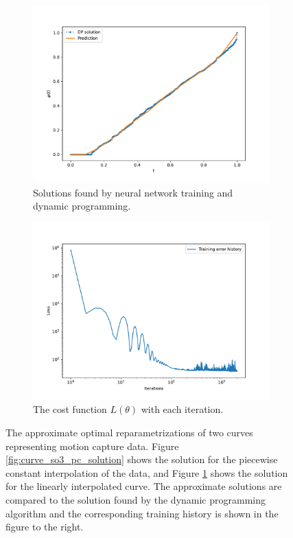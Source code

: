 \begin{figure}[t]
\begin{subfigure}[t]{0.5\textwidth}
        \centering
        \includegraphics[width=\linewidth]{figures/curve_so3/pl_eks_6/plot_288_0.pdf}
        \caption{Solutions found by neural network training and dynamic programming.}
        \label{fig:curve_so3_pl_solution}
    \end{subfigure}
    \begin{subfigure}[t]{0.5\textwidth}
        \centering
        \includegraphics[width=\linewidth]{figures/curve_so3/pl_eks_6/history_plot_288.pdf}
        \caption{The cost function \(L(\theta)\) with each iteration.}
        \label{fig:curve_so3_pl_history}
    \end{subfigure}
    \caption{The approximate optimal reparametrizations of two curves representing motion capture data. Figure \ref{fig:curve_so3_pc_solution} shows the solution for the piecewise constant interpolation of the data, and Figure \ref{fig:curve_so3_pl_solution} shows the solution for the linearly interpolated curve. The approximate solutions are compared to the solution found by the dynamic programming algorithm and the corresponding training history is shown in the figure to the right.}
\end{figure}

